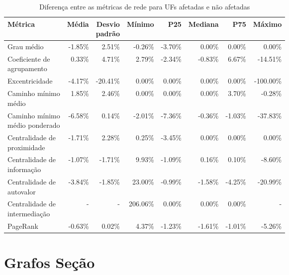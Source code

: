 \begin{table}[htb]
\centering
\caption{Diferença entre as métricas de rede para UFs afetadas e não afetadas}
\label{tab:metricas-redes-pandemia:diferenca-afetadas-por-uf}
\begin{tabular}{l|rrrrrrr}
\toprule
Métrica & Média & \shortstack{Desvio\\padrão} & Mínimo & P25 & Mediana & P75 & Máximo \\
\midrule
Grau médio                     & -1.85\% &   2.51\% &  -0.26\% & -3.70\% &  0.00\% &  0.00\% &    0.00\% \\ \hline
\shortstack[l]{Coeficiente de\\agrupamento}     &  0.33\% &   4.71\% &   2.79\% & -2.34\% & -0.83\% &  6.67\% &  -14.51\% \\ \hline
Excentricidade                 & -4.17\% & -20.41\% &   0.00\% &  0.00\% &  0.00\% &  0.00\% & -100.00\% \\ \hline
\shortstack[l]{Caminho mínimo\\médio}           &  1.85\% &   2.46\% &   0.00\% &  0.00\% &  0.00\% &  3.70\% &   -0.28\% \\ \hline
\shortstack[l]{Caminho mínimo\\médio ponderado} & -6.58\% &   0.14\% &  -2.01\% & -7.36\% & -0.36\% & -1.03\% &  -37.83\% \\ \hline
\shortstack[l]{Centralidade de\\proximidade}    & -1.71\% &   2.28\% &   0.25\% & -3.45\% &  0.00\% &  0.00\% &    0.00\% \\ \hline
\shortstack[l]{Centralidade de\\informação}     & -1.07\% &  -1.71\% &   9.93\% & -1.09\% &  0.16\% &  0.10\% &   -8.60\% \\ \hline
\shortstack[l]{Centralidade de\\autovalor}      & -3.84\% &  -1.85\% &  23.00\% & -0.99\% & -1.58\% & -4.25\% &  -20.99\% \\ \hline
\shortstack[l]{Centralidade de\\intermediação}  &  - &     - & 206.06\% &  0.00\% &  0.00\% &  0.00\% &    - \\ \hline
PageRank                       & -0.63\% &   0.02\% &   4.37\% & -1.23\% & -1.61\% & -1.01\% &   -5.26\% \\
\bottomrule
\end{tabular}
\fdadospesquisa
\end{table}

\section{Grafos Seção}

